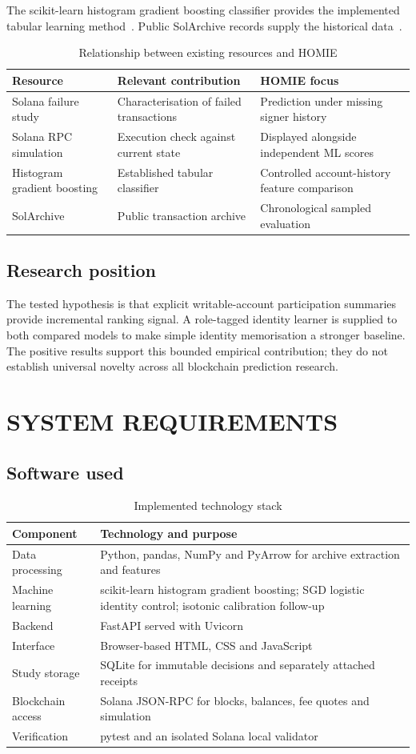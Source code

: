 \documentclass[12pt,a4paper,oneside]{report}
\begin{document}
The scikit-learn histogram gradient boosting classifier provides the implemented tabular learning method~\cite{hgb}. Public SolArchive records supply the historical data~\cite{archive}.
\begin{table}[ht]\centering\caption{Relationship between existing resources and HOMIE}
\small\begin{tabularx}{\textwidth}{p{32mm}YY}\toprule
Resource&Relevant contribution&HOMIE focus\\\midrule
Solana failure study&Characterisation of failed transactions&Prediction under missing signer history\\
Solana RPC simulation&Execution check against current state&Displayed alongside independent ML scores\\
Histogram gradient boosting&Established tabular classifier&Controlled account-history feature comparison\\
SolArchive&Public transaction archive&Chronological sampled evaluation\\\bottomrule\end{tabularx}\end{table}
\section{Research position}
The tested hypothesis is that explicit writable-account participation summaries provide incremental ranking signal. A role-tagged identity learner is supplied to both compared models to make simple identity memorisation a stronger baseline. The positive results support this bounded empirical contribution; they do not establish universal novelty across all blockchain prediction research.
\chapter{SYSTEM REQUIREMENTS}
\section{Software used}
\begin{table}[ht]\centering\caption{Implemented technology stack}
\begin{tabularx}{\textwidth}{p{38mm}Y}\toprule Component&Technology and purpose\\\midrule
Data processing&Python, pandas, NumPy and PyArrow for archive extraction and features\\
Machine learning&scikit-learn histogram gradient boosting; SGD logistic identity control; isotonic calibration follow-up\\
Backend&FastAPI served with Uvicorn\\
Interface&Browser-based HTML, CSS and JavaScript\\
Study storage&SQLite for immutable decisions and separately attached receipts\\
Blockchain access&Solana JSON-RPC for blocks, balances, fee quotes and simulation\\
Verification&pytest and an isolated Solana local validator\\\bottomrule\end{tabularx}\end{table}
\end{document}
